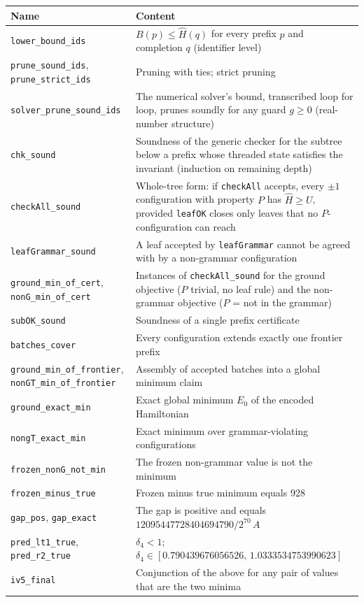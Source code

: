 \documentclass[11pt,a4paper]{article}
\theoremstyle{plain}
\theoremstyle{definition}
\theoremstyle{remark}
\newcommand{\lean}[1]{\nolinkurl{#1}}
\begin{document}
\begin{center}\small
\begin{tabularx}{\linewidth}{@{}p{4.1cm}X@{}}
\toprule
Name & Content\\
\midrule
\lean{lower_bound_ids} & $B(p)\le\hat H(q)$ for every prefix $p$ and completion $q$ (identifier level)\\
\lean{prune_sound_ids}, \lean{prune_strict_ids} & Pruning with ties; strict pruning\\
\lean{solver_prune_sound_ids} & The numerical solver's bound, transcribed loop for loop, prunes soundly for any guard $g\ge0$ (real-number structure)\\
\lean{chk_sound} & Soundness of the generic checker for the subtree below a prefix whose threaded state satisfies the invariant (induction on remaining depth)\\
\lean{checkAll_sound} & Whole-tree form: if \lean{checkAll} accepts, every $\pm1$ configuration with property $P$ has $\hat H\ge U$, provided \lean{leafOK} closes only leaves that no $P$-configuration can reach\\
\lean{leafGrammar_sound} & A leaf accepted by \lean{leafGrammar} cannot be agreed with by a non-grammar configuration\\
\lean{ground_min_of_cert}, \lean{nonG_min_of_cert} & Instances of \lean{checkAll_sound} for the ground objective ($P$ trivial, no leaf rule) and the non-grammar objective ($P$ = not in the grammar)\\
\lean{subOK_sound} & Soundness of a single prefix certificate\\
\lean{batches_cover} & Every configuration extends exactly one frontier prefix\\
\lean{ground_min_of_frontier}, \lean{nonGT_min_of_frontier} & Assembly of accepted batches into a global minimum claim\\
\lean{ground_exact_min} & Exact global minimum $E_0$ of the encoded Hamiltonian\\
\lean{nongT_exact_min} & Exact minimum over grammar-violating configurations\\
\lean{frozen_nonG_not_min} & The frozen non-grammar value is not the minimum\\
\lean{frozen_minus_true} & Frozen minus true minimum equals 928\\
\lean{gap_pos}, \lean{gap_exact} & The gap is positive and equals $12095447728404694790/2^{70}\,A$\\
\lean{pred_lt1_true}, \lean{pred_r2_true} & $\delta_4<1$; $\delta_4\in[0.790439676056526,\,1.0333534753990623]$\\
\lean{iv5_final} & Conjunction of the above for any pair of values that are the two minima\\
\bottomrule
\end{tabularx}
\end{center}
\end{document}
